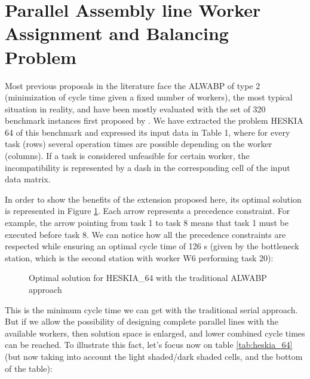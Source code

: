 \documentclass{singlecol-new}
\begin{document}
\section{Parallel Assembly line Worker Assignment and Balancing Problem}

Most previous proposals in the literature face the ALWABP of type 2 (minimization of cycle time given a fixed number of workers), the most typical situation in reality, and have been mostly evaluated with the set of 320 benchmark instances first proposed by \cite{chaves09hybrid}. We have extracted the problem HESKIA 64 of this benchmark and expressed its input data in Table 1, where  for every task (rows) several operation times are possible depending on the worker (columns). If a task is considered unfeasible for certain worker, the incompatibility is represented by a dash in the corresponding cell of the input data matrix.

In order to show the benefits of the extension proposed here, its optimal solution is represented in Figure \ref{fig:ex_heskia_64}. Each arrow represents a precedence constraint. For example, the arrow pointing from task 1 to task 8 means that task 1 must be executed before task 8. We can notice how all the precedence constraints are respected while ensuring an optimal cycle time of 126 s (given by the bottleneck station, which is the second station with worker W6 performing task 20): 

\begin{figure}[!ht]
\centering
{}
\caption{Optimal solution for HESKIA\_64 with the traditional ALWABP approach}
\label{fig:ex_heskia_64}
\end{figure}

This is the minimum cycle time we can get with the traditional serial approach. But if we allow the possibility of designing complete parallel lines with the available workers, then solution space is enlarged, and lower combined cycle times can be reached. To illustrate this fact, let's focus now on table \ref{tab:heskia_64} (but now taking into account the light shaded/dark shaded cells, and the bottom of the table):
\end{document}
